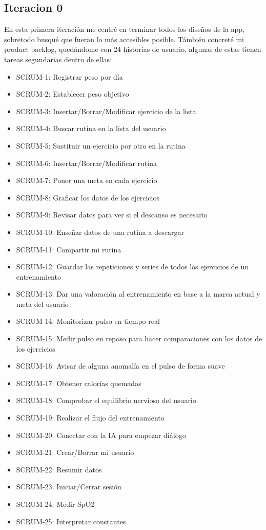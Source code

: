 \subsection{Iteracion 0}
En esta primera iteración me centré en terminar todos los diseños de la app, sobretodo busqué que fueran lo más accesibles posible. Támbién concreté mi product backlog, quedándome con 24 historias de usuario, algunas de estas tienen tareas segundarias dentro de ellas:
\begin{itemize}
    \item SCRUM-1: Registrar peso por día
    \item SCRUM-2: Establecer peso objetivo
    \item SCRUM-3: Insertar/Borrar/Modificar ejercicio de la lista
    \item SCRUM-4: Buscar rutina en la lista del usuario
    \item SCRUM-5: Sustituir un ejercicio por otro en la rutina
    \item SCRUM-6: Insertar/Borrar/Modificar rutina
    \item SCRUM-7: Poner una meta en cada ejercicio
    \item SCRUM-8: Graficar los datos de los ejercicios
    \item SCRUM-9: Revisar datos para ver si el descanso es necesario
    \item SCRUM-10: Enseñar datos de una rutina a descargar
    \item SCRUM-11: Compartir mi rutina
    \item SCRUM-12: Guardar las repeticiones y series de todos los ejercicios de un entrenamiento
    \item SCRUM-13: Dar una valoración al entrenamiento en base a la marca actual y meta del usuario
    \item SCRUM-14: Monitorizar pulso en tiempo real
    \item SCRUM-15: Medir pulso en reposo para hacer comparaciones con los datos de los ejercicios
    \item SCRUM-16: Avisar de alguna anomalía en el pulso de forma suave
    \item SCRUM-17: Obtener calorías quemadas
    \item SCRUM-18: Comprobar el equilibrio nervioso del usuario
    \item SCRUM-19: Realizar el flujo del entrenamiento
    \item SCRUM-20: Conectar con la IA para empezar diálogo
    \item SCRUM-21: Crear/Borrar mi usuario
    \item SCRUM-22: Resumir datos
    \item SCRUM-23: Iniciar/Cerrar sesión
    \item SCRUM-24: Medir SpO2
    \item SCRUM-25: Interpretar constantes
\end{itemize}
